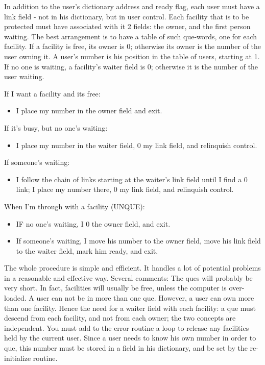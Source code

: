 \documentclass[b5paper, oneside]{book}
\begin{document}
In addition to the user's dictionary address and ready flag, each user must have a link field - not in his dictionary, but in user control. Each facility that is to be protected must have associated with it 2 fields: the owner, and the first person waiting. The best arrangement is to have a table of such que-words, one for each facility. If a facility is free, its owner is 0; otherwise its owner is the number of the user owning it. A user's number is his position in the table of users, starting at 1. If no one is waiting, a facility's waiter field is 0; otherwise it is the number of the user waiting.

If I want a facility and its free:\begin{itemize}
   \item I place my number in the owner field and exit.\end{itemize}
If it's busy, but no one's waiting:\begin{itemize}
   \item I place my number in the waiter field, 0 my link field, and relinquish control.\end{itemize}
If someone's waiting:\begin{itemize}
   \item I follow the chain of links starting at the waiter's link field until I find a 0 link; I place my number there, 0 my link field, and relinquish control.\end{itemize}
When I'm through with a facility (UNQUE):\begin{itemize}
   \item IF no one's waiting, I 0 the owner field, and exit.
   \item If someone's waiting, I move his number to the owner field, move his link field to the waiter field, mark him ready, and exit.\end{itemize}

The whole procedure is simple and efficient. It handles a lot of potential problems in a reasonable and effective way. Several comments: The ques will probably be very short. In fact, facilities will usually be free, unless the computer is over-loaded. A user can not be in more than one que. However, a user can own more than one facility. Hence the need for a waiter field with each facility: a que must descend from each facility, and not from each owner; the two concepts are independent. You must add to the error routine a loop to release any facilities held by the current user. Since a user needs to know his own number in order to que, this number must be stored in a field in his dictionary, and be set by the re-initialize routine.
\end{document}
